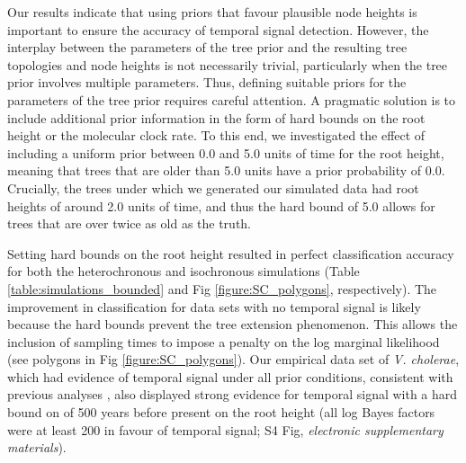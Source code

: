 \documentclass[10pt,letterpaper]{article}
\begin{document}
Our results indicate that using priors that favour plausible node heights is important to ensure the accuracy of temporal signal detection. However, the interplay between the parameters of the tree prior and the resulting tree topologies and node heights is not necessarily trivial, particularly when the tree prior involves multiple parameters. Thus, defining suitable priors for the parameters of the tree prior requires careful attention. A pragmatic solution is to include additional prior information in the form of hard bounds on the root height or the molecular clock rate. To this end, we investigated the effect of including a uniform prior between 0.0 and 5.0 units of time for the root height, meaning that trees that are older than 5.0 units have a prior probability of 0.0. Crucially, the trees under which we generated our simulated data had root heights of around 2.0 units of time, and thus the hard bound of 5.0 allows for trees that are over twice as old as the truth. 

Setting hard bounds on the root height resulted in perfect classification accuracy for both the heterochronous and isochronous simulations (Table \ref{table:simulations_bounded} and Fig \ref{figure:SC_polygons}, respectively). The improvement in classification for data sets with no temporal signal is likely because the hard bounds prevent the tree extension phenomenon. This allows the inclusion of sampling times to impose a penalty on the log marginal likelihood (see polygons in Fig \ref{figure:SC_polygons}). Our empirical data set of \textit{V. cholerae}, which had evidence of temporal signal under all prior conditions, {consistent with previous analyses \cite{devault2014second}}, also displayed strong evidence for temporal signal with a hard bound on of 500 years before present on the root height (all log Bayes factors were at least 200 in favour of temporal signal; S4 Fig, \textit{electronic supplementary materials}).
\end{document}
